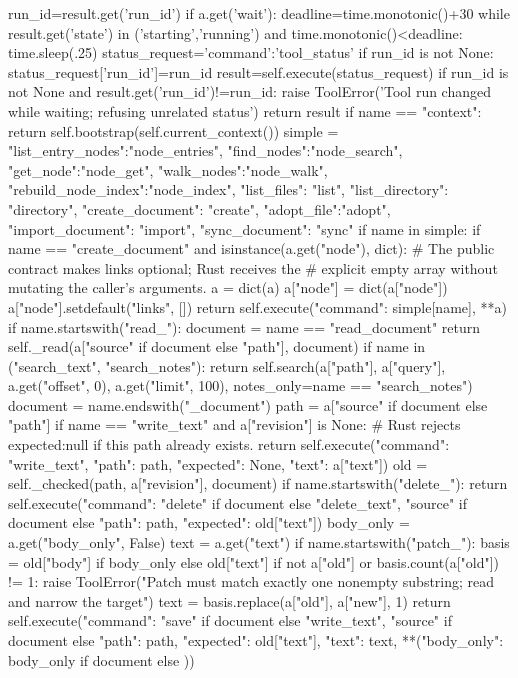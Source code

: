             run_id=result.get('run_id')
            if a.get('wait'):
                deadline=time.monotonic()+30
                while result.get('state') in ('starting','running') and time.monotonic()<deadline:
                    time.sleep(.25)
                    status_request={'command':'tool_status'}
                    if run_id is not None:
                        status_request['run_id']=run_id
                    result=self.execute(status_request)
                    if run_id is not None and result.get('run_id')!=run_id:
                        raise ToolError('Tool run changed while waiting; refusing unrelated status')
            return result
        if name == "context":
            return self.bootstrap(self.current_context())
        simple = {"list_entry_nodes":"node_entries", "find_nodes":"node_search", "get_node":"node_get", "walk_nodes":"node_walk", "rebuild_node_index":"node_index",
            "list_files": "list", "list_directory": "directory", "create_document": "create", "adopt_file":"adopt",
            "import_document": "import", "sync_document": "sync"}
        if name in simple:
            if name == "create_document" and isinstance(a.get("node"), dict):
                # The public contract makes links optional; Rust receives the
                # explicit empty array without mutating the caller's arguments.
                a = dict(a)
                a["node"] = dict(a["node"])
                a["node"].setdefault("links", [])
            return self.execute({"command": simple[name], **a})
        if name.startswith("read_"):
            document = name == "read_document"
            return self._read(a["source" if document else "path"], document)
        if name in ("search_text", "search_notes"):
            return self.search(a["path"], a["query"], a.get("offset", 0), a.get("limit", 100), notes_only=name == "search_notes")
        document = name.endswith("_document")
        path = a["source" if document else "path"]
        if name == "write_text" and a["revision"] is None:
            # Rust rejects expected:null if this path already exists.
            return self.execute({"command": "write_text", "path": path, "expected": None, "text": a["text"]})
        old = self._checked(path, a["revision"], document)
        if name.startswith("delete_"):
            return self.execute({"command": "delete" if document else "delete_text",
                "source" if document else "path": path, "expected": old["text"]})
        body_only = a.get("body_only", False)
        text = a.get("text")
        if name.startswith("patch_"):
            basis = old["body"] if body_only else old["text"]
            if not a["old"] or basis.count(a["old"]) != 1:
                raise ToolError("Patch must match exactly one nonempty substring; read and narrow the target")
            text = basis.replace(a["old"], a["new"], 1)
        return self.execute({"command": "save" if document else "write_text",
            "source" if document else "path": path, "expected": old["text"], "text": text,
            **({"body_only": body_only} if document else {})})


